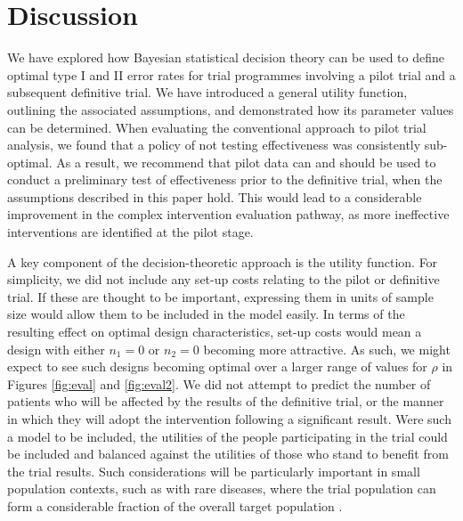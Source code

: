 \documentclass[sagev, Crown]{sagej} %
\begin{document}
\section{Discussion}\label{sec:discussion}

We have explored how Bayesian statistical decision theory can be used to define optimal type I and II error rates for trial programmes involving a pilot trial and a subsequent definitive trial. We have introduced a general utility function, outlining the associated assumptions, and demonstrated how its parameter values can be determined. When evaluating the conventional approach to pilot trial analysis, we found that a policy of not testing effectiveness was consistently sub-optimal. As a result, we recommend that pilot data can and should be used to conduct a preliminary test of effectiveness prior to the definitive trial, when the assumptions described in this paper hold. This would lead to a considerable improvement in the complex intervention evaluation pathway, as more ineffective interventions are identified at the pilot stage.

A key component of the decision-theoretic approach is the utility function. For simplicity, we did not include any set-up costs relating to the pilot or definitive trial. If these are thought to be important, expressing them in units of sample size would allow them to be included in the model easily. In terms of the resulting effect on optimal design characteristics, set-up costs would mean a design with either $n_1 = 0 $ or $n_2 = 0$ becoming more attractive. As such, we might expect to see such designs becoming optimal over a larger range of values for $\rho$ in Figures \ref{fig:eval} and \ref{fig:eval2}. We did not attempt to predict the number of patients who will be affected by the results of the definitive trial, or the manner in which they will adopt the intervention following a significant result. Were such a model to be included, the utilities of the people participating in the trial could be included and balanced against the utilities of those who stand to benefit from the trial results. Such considerations will be particularly important in small population contexts, such as with rare diseases, where the trial population can form a considerable fraction of the overall target population \cite{Pearce2018}. 
\end{document}
